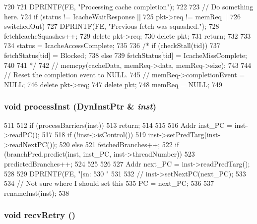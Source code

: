 \begin{DoxyCode}
720 {
721     DPRINTF(FE, "Processing cache completion\n");
722 
723     // Do something here.
724     if (status != IcacheWaitResponse ||
725         pkt->req != memReq ||
726         switchedOut) {
727         DPRINTF(FE, "Previous fetch was squashed.\n");
728         fetchIcacheSquashes++;
729         delete pkt->req;
730         delete pkt;
731         return;
732     }
733 
734     status = IcacheAccessComplete;
735 
736 /*    if (checkStall(tid)) {
737         fetchStatus[tid] = Blocked;
738     } else {
739         fetchStatus[tid] = IcacheMissComplete;
740     }
741 */
742 //    memcpy(cacheData, memReq->data, memReq->size);
743 
744     // Reset the completion event to NULL.
745 //    memReq->completionEvent = NULL;
746     delete pkt->req;
747     delete pkt;
748     memReq = NULL;
749 }
\end{DoxyCode}
\hypertarget{classFrontEnd_a91359adcd9112672ff9264d6428b4106}{
\subsubsection[{processInst}]{\setlength{\rightskip}{0pt plus 5cm}void processInst ({\bf DynInstPtr} \& {\em inst})}}
\label{classFrontEnd_a91359adcd9112672ff9264d6428b4106}



\begin{DoxyCode}
511 {
512     if (processBarriers(inst)) {
513         return;
514     }
515 
516     Addr inst_PC = inst->readPC();
517 
518     if (!inst->isControl()) {
519         inst->setPredTarg(inst->readNextPC());
520     } else {
521         fetchedBranches++;
522         if (branchPred.predict(inst, inst_PC, inst->threadNumber)) {
523             predictedBranches++;
524         }
525     }
526 
527     Addr next_PC = inst->readPredTarg();
528 
529     DPRINTF(FE, "[sn:%
530             "%
531 
532 //    inst->setNextPC(next_PC);
533 
534     // Not sure where I should set this
535     PC = next_PC;
536 
537     renameInst(inst);
538 }
\end{DoxyCode}
\hypertarget{classFrontEnd_a29cb5a4f98063ce6e9210eacbdb35298}{
\subsubsection[{recvRetry}]{\setlength{\rightskip}{0pt plus 5cm}void recvRetry ()}}
\label{classFrontEnd_a29cb5a4f98063ce6e9210eacbdb35298}



